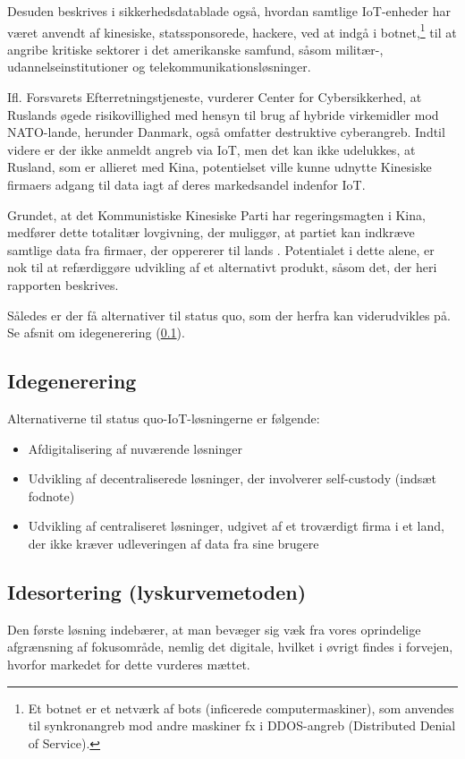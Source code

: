 \documentclass[11pt]{article}
\begin{document}
Desuden beskrives i sikkerhedsdatablade også, hvordan samtlige IoT-enheder har været anvendt af kinesiske, statssponsorede, hackere, ved at indgå i botnet,\footnote{Et botnet er et netværk af bots (inficerede computermaskiner), som anvendes til synkronangreb mod andre maskiner fx i DDOS-angreb (Distributed Denial of Service).} til at angribe kritiske sektorer i det amerikanske samfund, såsom militær-, udannelseinstitutioner og telekommunikationsløsninger. 

Ifl. Forsvarets Efterretningstjeneste, vurderer Center for Cybersikkerhed, at Ruslands øgede risikovillighed med hensyn til brug af hybride virkemidler mod NATO-lande, herunder Danmark, også omfatter destruktive cyberangreb. Indtil videre er der ikke anmeldt angreb via IoT, men det kan ikke udelukkes, at Rusland, som er allieret med Kina, potentielset ville kunne udnytte Kinesiske firmaers adgang til data iagt af deres markedsandel indenfor IoT.

Grundet, at det Kommunistiske Kinesiske Parti har regeringsmagten i Kina, medfører dette totalitær lovgivning, der muliggør, at partiet kan indkræve samtlige data fra firmaer, der oppererer til lands . Potentialet i dette alene, er nok til at refærdiggøre udvikling af et alternativt produkt, såsom det, der heri rapporten beskrives.

Således er der få alternativer til status quo, som der herfra kan viderudvikles på. Se afsnit om idegenerering (\ref{sec:org12d3e0c}).
\subsection{Idegenerering}
\label{sec:org12d3e0c}
Alternativerne til status quo-IoT-løsningerne er følgende:
\begin{itemize}
\item Afdigitalisering af nuværende løsninger
\item Udvikling af decentraliserede løsninger, der involverer self-custody (indsæt fodnote)
\item Udvikling af centraliseret løsninger, udgivet af et troværdigt firma i et land, der ikke kræver udleveringen af data fra sine brugere
\end{itemize}
\subsection{Idesortering (lyskurvemetoden)}
\label{sec:orgb65406b}
Den første løsning indebærer, at man bevæger sig væk fra vores oprindelige afgrænsning af fokusområde, nemlig det digitale, hvilket i øvrigt findes i forvejen, hvorfor markedet for dette vurderes mættet.
\end{document}
